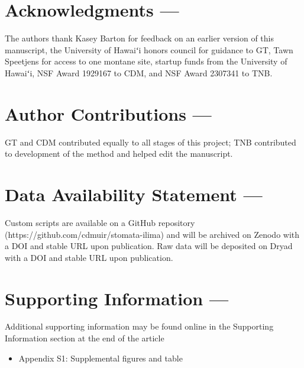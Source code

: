 \documentclass[
  letterpaper,
  DIV=11,
  numbers=noendperiod]{scrartcl}
\providecommand{\tightlist}{%
  \setlength{\itemsep}{0pt}\setlength{\parskip}{0pt}}\usepackage{longtable,booktabs,array}
\begin{document}
\hypertarget{acknowledgments}{%
\section{Acknowledgments ---}\label{acknowledgments}}

The authors thank Kasey Barton for feedback on an earlier version of
this manuscript, the University of Hawaiʻi honors council for guidance
to GT, Tawn Speetjens for access to one montane site, startup funds from
the University of Hawaiʻi, NSF Award 1929167 to CDM, and NSF Award
2307341 to TNB.

\hypertarget{author-ontributions}{%
\section{Author Contributions ---}\label{author-ontributions}}

GT and CDM contributed equally to all stages of this project; TNB
contributed to development of the method and helped edit the manuscript.

\hypertarget{data-availability-statement}{%
\section{Data Availability Statement
---}\label{data-availability-statement}}

Custom scripts are available on a GitHub repository
(https://github.com/cdmuir/stomata-ilima) and will be archived on Zenodo
with a DOI and stable URL upon publication. Raw data will be deposited
on Dryad with a DOI and stable URL upon publication.

\hypertarget{supporting-information}{%
\section{Supporting Information ---}\label{supporting-information}}

Additional supporting information may be found online in the Supporting
Information section at the end of the article

\begin{itemize}
\tightlist
\item
  Appendix S1: Supplemental figures and table
\end{itemize}

\renewcommand\thefigure{S\arabic{figure}}    
\renewcommand\thetable{S\arabic{table}}    
\renewcommand\theequation{S\arabic{equation}}    
\setcounter{figure}{0}    
\setcounter{table}{0}    
\setcounter{equation}{0}
\end{document}
